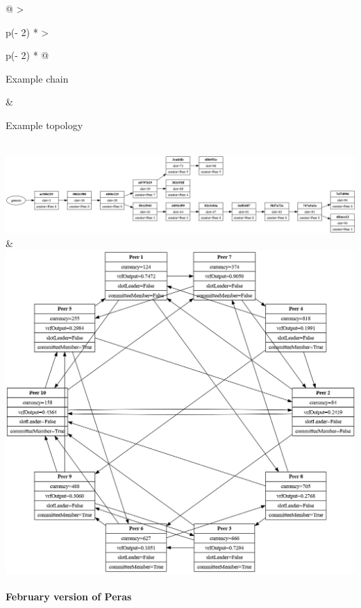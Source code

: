 \documentclass[10pt]{article}
\begin{document}
\begin{longtable}[]{@{}
  >{\raggedright\arraybackslash}p{(\columnwidth - 2\tabcolsep) * }
  >{\raggedright\arraybackslash}p{(\columnwidth - 2\tabcolsep) * }@{}}
\toprule\noalign{}
\begin{minipage}[b]{\linewidth}\raggedright
Example chain
\end{minipage} & \begin{minipage}[b]{\linewidth}\raggedright
Example topology
\end{minipage} \\
\midrule\noalign{}
\endhead
\bottomrule\noalign{}
\endlastfoot
\includegraphics{../diagrams/sim-expts/example-chain.png} &
\includegraphics{../diagrams/sim-expts/example-network.png} \\
\end{longtable}

\paragraph{February version of Peras}\label{february-version-of-peras}
\end{document}
